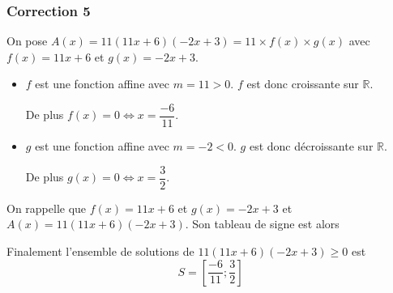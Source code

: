 \documentclass[15pt, mathserif]{beamer}
\begin{document}
\begin{frame}
\vspace{-10mm}
	\frametitle{Correction 5}
On pose $A(x) = 11(11x+6)(-2x+3) = 11\times f(x) \times g(x)$ avec $f(x) = 11x+6$ et $g(x) = -2x+3$.

\begin{itemize}
	\item $f$ est une fonction affine avec $m =11>0$. $f$ est donc croissante sur $\mathbb{R}$.

	 De plus $f(x) = 0 \Leftrightarrow x = \dfrac{-6}{11}$.
	\item $g$ est une fonction affine avec $m =-2<0$. $g$ est donc décroissante sur $\mathbb{R}$.

	 De plus $g(x) = 0 \Leftrightarrow x = \dfrac{3}{2}$.
\end{itemize}

 \end{frame}


\begin{frame}On rappelle que $f(x) = 11x+6$ et $g(x) = -2x+3$ et $A(x) = 11(11x+6)(-2x+3)$. Son tableau de signe est alors 

\medskip \hfil
{}

 Finalement l'ensemble de solutions de $11(11x+6)(-2x+3)\geq0$ est\[S = \left[\dfrac{-6}{11};\dfrac{3}{2}\right]\]

\end{frame}
\end{document}
